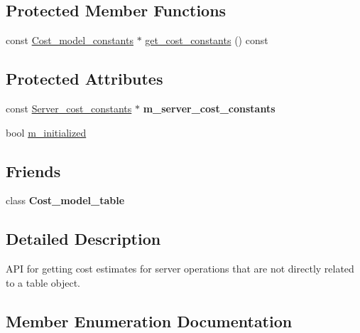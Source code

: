 \subsection*{Protected Member Functions}
\begin{DoxyCompactItemize}
\item 
const \mbox{\hyperlink{classCost__model__constants}{Cost\+\_\+model\+\_\+constants}} $\ast$ \mbox{\hyperlink{classCost__model__server_ae2d32c871cdee2b0461b43d43bb24685}{get\+\_\+cost\+\_\+constants}} () const
\end{DoxyCompactItemize}
\subsection*{Protected Attributes}
\begin{DoxyCompactItemize}
\item 
\mbox{\label{classCost__model__server_adaaa56d00e1e122f925f5dea2c8ce7d7}} 
const \mbox{\hyperlink{classServer__cost__constants}{Server\+\_\+cost\+\_\+constants}} $\ast$ {\bfseries m\+\_\+server\+\_\+cost\+\_\+constants}
\item 
bool \mbox{\hyperlink{classCost__model__server_a3ea4fa00d273ad8d38bb9268fcbfeae0}{m\+\_\+initialized}}
\end{DoxyCompactItemize}
\subsection*{Friends}
\begin{DoxyCompactItemize}
\item 
\mbox{\label{classCost__model__server_a567e5e00dd7bf84f63f12c885d0bd53f}} 
class {\bfseries Cost\+\_\+model\+\_\+table}
\end{DoxyCompactItemize}


\subsection{Detailed Description}
A\+PI for getting cost estimates for server operations that are not directly related to a table object. 

\subsection{Member Enumeration Documentation}
\mbox{\label{classCost__model__server_a140ad6035a21dbe363f69eb4b5ea98c0}} 
